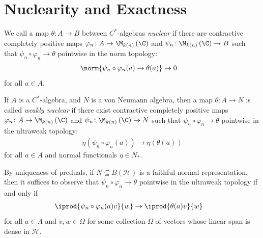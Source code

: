 \documentclass[10pt]{mypackage}
\begin{document}
\section{Nuclearity and Exactness}%
\begin{definition}
  We call a map $\theta\colon A\rightarrow B$ between $C^{\ast}$-algebras \textit{nuclear} if there are contractive completely positive maps $\varphi_n\colon A\rightarrow \M_{k(n)}\left( \C \right)$ and $\psi_n\colon \M_{k(n)}\left( \C \right)\rightarrow B$ such that $\psi_n\circ\varphi_n\rightarrow\theta$ pointwise in the norm topology:
  \begin{align*}
    \norm{\psi_n\circ\varphi_n(a)\rightarrow\theta(a)}&\rightarrow 0
  \end{align*}
  for all $a\in A$.
\end{definition}
\begin{definition}
  If $A$ is a $C^{\ast}$-algebra, and $N$ is a von Neumann algebra, then a map $\theta\colon A\rightarrow N$ is called \textit{weakly nuclear} if there exist contractive completely positive maps $\varphi_n\colon A\rightarrow \M_{k(n)}\left( \C \right)$ and $\psi_n\colon \M_{k(n)}\left( \C \right)\rightarrow N$ such that $\psi_n\circ\varphi_n\rightarrow \theta$ pointwise in the ultraweak topology:
  \begin{align*}
    \eta\left( \psi_n\circ\varphi_n(a) \right)\rightarrow\eta\left( \theta(a) \right)
  \end{align*}
  for all $a\in A$ and normal functionals $\eta\in N_{\ast}$.
\end{definition}
By uniqueness of preduals, if $N\subseteq B\left(\mathcal{H}\right)$ is a faithful normal representation, then it suffices to observe that $\psi_n\circ\varphi_n\rightarrow\theta$ pointwise in the ultraweak topology if and only if
\begin{align*}
  \iprod{\psi_n\circ\varphi_n(a)v}{w} &\rightarrow \iprod{\theta(a)v}{w}
\end{align*}
for all $a\in A$ and $v,w\in \Omega$ for some collection $\Omega$ of vectors whose linear span is dense in $\mathcal{H}$.
\end{document}
